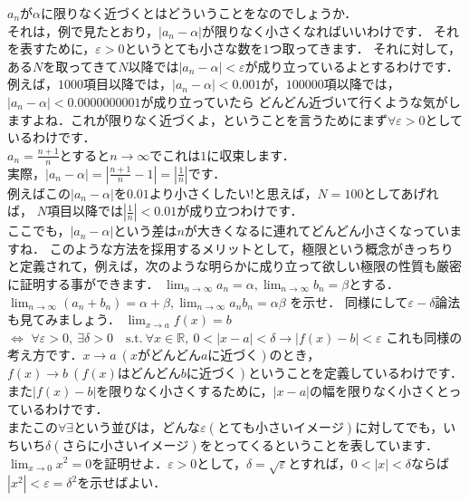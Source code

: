$a_n$が$\alpha$に限りなく近づくとはどういうことをなのでしょうか．\\
それは，例で見たとおり，$|a_n - \alpha|$が限りなく小さくなればいいわけです．
それを表すために，$\varepsilon > 0$というとても小さな数を$1$つ取ってきます．
それに対して，ある$N$を取ってきて$N$以降では$|a_n - \alpha | < \varepsilon$が成り立っているよとするわけです．\\
例えば，$1000$項目以降では，$|a_n - \alpha| < 0.001$が，$100000$項以降では，$|a_n - \alpha | < 0.0000000001$が成り立っていたら
どんどん近づいて行くような気がしますよね．これが限りなく近づくよ，ということを言うためにまず$\forall \varepsilon > 0$としているわけです．\\
\ex
$a_n = \frac{n+1}{n}$とすると$n \to \infty $でこれは$1$に収束します．\\
実際，$|a_n - \alpha| = | \frac{n+1}{n} - 1 | = | \frac{1}{n} |$です．\\
例えばこの$|a_n - \alpha|$を$0.01$より小さくしたい!と思えば，$N=100$としてあげれば，
$N$項目以降では$|\frac{1}{n}| < 0.01$が成り立つわけです．\\
ここでも，$|a_n - \alpha| $という差は$n$が大きくなるに連れてどんどん小さくなっていますね．
\exx
このような方法を採用するメリットとして，極限という概念がきっちりと定義されて，例えば，次のような明らかに成り立って欲しい極限の性質も厳密に証明する事ができます．
\prob
$\lim_{n\to\infty} a_n = \alpha , \lim_{n\to\infty} b_n = \beta $とする．\\
$\lim_{n\to\infty} (a_n + b_n) = \alpha + \beta , \lim_{n\to\infty} a_n b_n = \alpha\beta $
を示せ．
\probx
同様にして$\varepsilon-\delta$論法も見てみましょう．
$\lim_{x \to a}f(x) = b$\\
$\iff$
$\forall \varepsilon > 0,\  \exists \delta > 0\quad \textrm{s.t.}\  \forall x \in \mathbb{R},\  0 < |x-a| < \delta \to |f(x)-b| < \varepsilon$
これも同様の考え方です．$x\to a\  (xがどんどんaに近づく)$のとき，$f(x) \to b\  (f(x)はどんどんbに近づく)$ということを定義しているわけです．また$|f(x)-b|$を限りなく小さくするために，$|x-a|$の幅を限りなく小さくとっているわけです．\\
またこの$\forall \exists$という並びは，どんな$\varepsilon (とても小さいイメージ)$に対してでも，いちいち$\delta (さらに小さいイメージ)$をとってくるということを表しています．
\prob
$\lim_{x\to 0} x^2 = 0$を証明せよ．$\varepsilon >0$として，$\delta = \sqrt{\varepsilon}$とすれば，$ 0 < | x | < \delta$ならば$ |x^2| < \varepsilon = \delta^2$を示せばよい． 
\probx
{}
